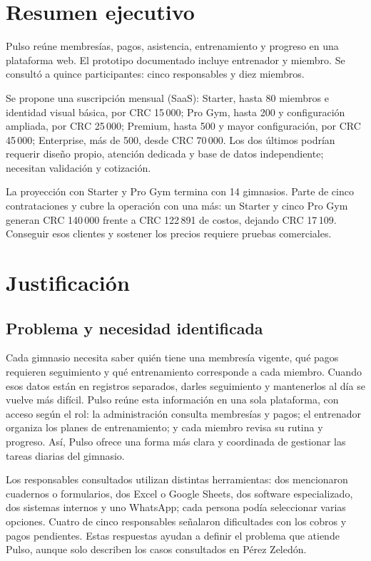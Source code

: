 \section*{Resumen ejecutivo}

Pulso reúne membresías, pagos, asistencia, entrenamiento y progreso en una plataforma web. El prototipo documentado incluye entrenador y miembro. Se consultó a quince participantes: cinco responsables y diez miembros.

Se propone una suscripción mensual (SaaS): Starter, hasta 80 miembros e identidad visual básica, por CRC 15\,000; Pro Gym, hasta 200 y configuración ampliada, por CRC 25\,000; Premium, hasta 500 y mayor configuración, por CRC 45\,000; Enterprise, más de 500, desde CRC 70\,000. Los dos últimos podrían requerir diseño propio, atención dedicada y base de datos independiente; necesitan validación y cotización.

La proyección con Starter y Pro Gym termina con 14 gimnasios. Parte de cinco contrataciones y cubre la operación con una más: un Starter y cinco Pro Gym generan CRC 140\,000 frente a CRC 122\,891 de costos, dejando CRC 17\,109. Conseguir esos clientes y sostener los precios requiere pruebas comerciales.

\section{Justificación}

\subsection{Problema y necesidad identificada}

Cada gimnasio necesita saber quién tiene una membresía vigente, qué pagos
requieren seguimiento y qué entrenamiento corresponde a cada miembro. Cuando
esos datos están en registros separados, darles seguimiento y mantenerlos al
día se vuelve más difícil. Pulso reúne esta información en una sola plataforma,
con acceso según el rol: la administración consulta membresías y pagos; el
entrenador organiza los planes de entrenamiento; y cada miembro revisa su rutina
y progreso. Así, Pulso ofrece una forma más clara y coordinada de gestionar las
tareas diarias del gimnasio.

Los responsables consultados utilizan distintas herramientas: dos mencionaron
cuadernos o formularios, dos Excel o Google Sheets, dos software especializado,
dos sistemas internos y uno WhatsApp; cada persona podía seleccionar varias
opciones. Cuatro de cinco responsables señalaron dificultades con los cobros y
pagos pendientes. Estas respuestas ayudan a definir el problema que atiende
Pulso, aunque solo describen los casos consultados en Pérez Zeledón.

